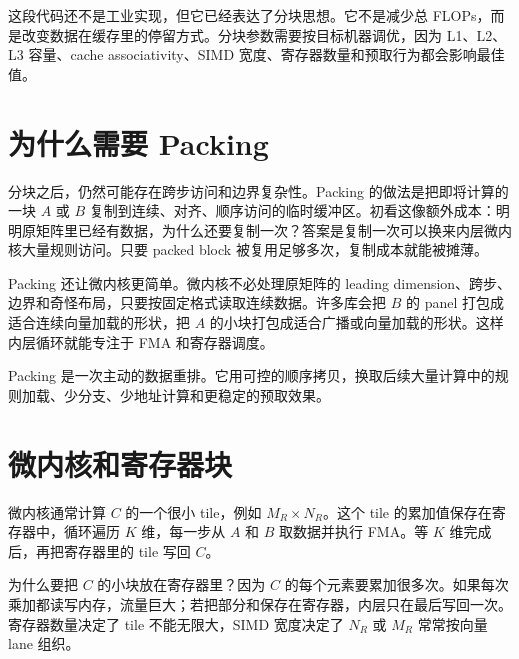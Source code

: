这段代码还不是工业实现，但它已经表达了分块思想。它不是减少总 FLOPs，而是改变数据在缓存里的停留方式。分块参数需要按目标机器调优，因为 L1、L2、L3 容量、cache associativity、SIMD 宽度、寄存器数量和预取行为都会影响最佳值。

\section{为什么需要 Packing}

分块之后，仍然可能存在跨步访问和边界复杂性。Packing 的做法是把即将计算的一块 $A$ 或 $B$ 复制到连续、对齐、顺序访问的临时缓冲区。初看这像额外成本：明明原矩阵里已经有数据，为什么还要复制一次？答案是复制一次可以换来内层微内核大量规则访问。只要 packed block 被复用足够多次，复制成本就能被摊薄。

Packing 还让微内核更简单。微内核不必处理原矩阵的 leading dimension、跨步、边界和奇怪布局，只要按固定格式读取连续数据。许多库会把 $B$ 的 panel 打包成适合连续向量加载的形状，把 $A$ 的小块打包成适合广播或向量加载的形状。这样内层循环就能专注于 FMA 和寄存器调度。

\begin{mentalmodel}
Packing 是一次主动的数据重排。它用可控的顺序拷贝，换取后续大量计算中的规则加载、少分支、少地址计算和更稳定的预取效果。
\end{mentalmodel}

\section{微内核和寄存器块}

微内核通常计算 $C$ 的一个很小 tile，例如 $M_R \times N_R$。这个 tile 的累加值保存在寄存器中，循环遍历 $K$ 维，每一步从 $A$ 和 $B$ 取数据并执行 FMA。等 $K$ 维完成后，再把寄存器里的 tile 写回 $C$。

为什么要把 $C$ 的小块放在寄存器里？因为 $C$ 的每个元素要累加很多次。如果每次乘加都读写内存，流量巨大；若把部分和保存在寄存器，内层只在最后写回一次。寄存器数量决定了 tile 不能无限大，SIMD 宽度决定了 $N_R$ 或 $M_R$ 常常按向量 lane 组织。

